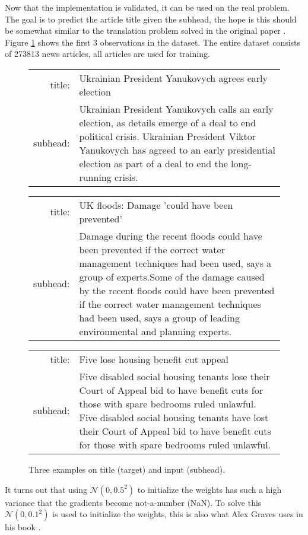 Now that the implementation is validated, it can be used on the real problem. The goal is to predict the article title given the subhead, the hope is this should be somewhat similar to the translation problem solved in the original paper \cite{sutskever}. Figure \ref{fig:results:sutskever:example} shows the first 3 observations in the dataset. The entire dataset consists of 273813 news articles, all articles are used for training.

\begin{figure}[H]
\centering
\begin{tabular}{r|p{10cm}}
	title: & Ukrainian President Yanukovych agrees early election \\
	subhead: & Ukrainian President Yanukovych calls an early election, as details emerge of a deal to end political crisis. Ukrainian President Viktor Yanukovych has agreed to an early presidential election as part of a deal to end the long-running crisis.
\end{tabular}
\mbox{}\vspace*{0.5cm}
\begin{tabular}{r|p{10cm}}
	title: & UK floods: Damage 'could have been prevented' \\
	subhead: & Damage during the recent floods could have been prevented if the correct water management techniques had been used, says a group of experts.Some of the damage caused by the recent floods could have been prevented if the correct water management techniques had been used, says a group of leading environmental and planning experts.
\end{tabular}
\mbox{}\vspace*{0.5cm}
\begin{tabular}{r|p{10cm}}
	title: & Five lose housing benefit cut appeal \\
	subhead: & Five disabled social housing tenants lose their Court of Appeal bid to have benefit cuts for those with spare bedrooms ruled unlawful. Five disabled social housing tenants have lost their Court of Appeal bid to have benefit cuts for those with spare bedrooms ruled unlawful.
\end{tabular}
\caption{Three examples on title (target) and input (subhead).}
\label{fig:results:sutskever:example}
\end{figure}

It turns out that using $\mathcal{N}(0, 0.5^2)$ to initialize the weights has such a high variance that the gradients become not-a-number (NaN). To solve this $\mathcal{N}(0, 0.1^2)$ is used to initialize the weights, this is also what Alex Graves uses in his book \cite{alexgraves}.

